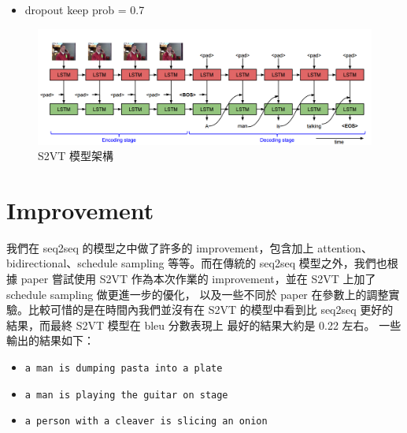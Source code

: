 \documentclass[12pt, a4paper]{article}
\theoremstyle{mystyle}	%
\begin{document}
\begin{enumerate}
\begin{itemize}
  \item dropout keep prob = 0.7
\end{itemize}
\begin{figure}[!htb]
  \centering
  \includegraphics[scale=0.4]{s2vt.png}
  \caption{S2VT 模型架構}
  \label{fig:s2vt}
 \endminipage
\end{figure}

\end{enumerate}

\section{Improvement}
我們在 seq2seq 的模型之中做了許多的 improvement，包含加上
attention、bidirectional、schedule sampling 等等。而在傳統的
seq2seq 模型之外，我們也根據 paper 嘗試使用 S2VT 作為本次作業的
improvement，並在 S2VT 上加了 schedule sampling 做更進一步的優化，
以及一些不同於 paper 在參數上的調整實驗。比較可惜的是在時間內我們並沒有在
S2VT 的模型中看到比 seq2seq 更好的結果，而最終 S2VT 模型在 bleu 分數表現上
最好的結果大約是 0.22 左右。
一些輸出的結果如下：
\begin{itemize}
  \item \texttt{a man is dumping pasta into a plate}
  \item \texttt{a man is playing the guitar on stage}
  \item \texttt{a person with a cleaver is slicing an onion}
\end{itemize}
\end{document}
